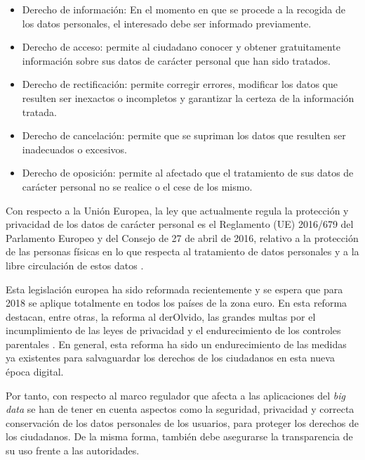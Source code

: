 \clearpage
\begin{itemize}
\item Derecho de información: En el momento en que se procede a la recogida de los datos personales, el interesado debe ser informado previamente. 

\item Derecho de acceso: permite al ciudadano conocer y obtener gratuitamente información sobre sus datos de carácter personal que han sido tratados.

\item Derecho de rectificación: permite corregir errores, modificar los datos que resulten ser inexactos o incompletos y garantizar la certeza de la información tratada.

\item Derecho de cancelación: permite que se supriman los datos que resulten ser inadecuados o excesivos.

\item Derecho de oposición: permite al afectado que el tratamiento de sus datos de carácter personal no se realice o el cese de los mismo.
\end{itemize}

Con respecto a la Unión Europea, la ley que actualmente regula la protección y privacidad de los datos de carácter personal es el Reglamento (UE) 2016/679 del Parlamento Europeo y del Consejo de 27 de abril de 2016, relativo a la protección de las personas físicas en lo que respecta al tratamiento de datos personales y a la libre circulación de estos datos \cite{lawEU}.

Esta legislación europea ha sido reformada recientemente y se espera que para 2018 se aplique totalmente en todos los países de la zona euro. En esta reforma destacan, entre otras, la reforma al \Gls{derOlvido}, las grandes multas por el incumplimiento de las leyes de privacidad y el endurecimiento de los controles parentales \cite{rulesEU}. En general, esta reforma ha sido un endurecimiento de las medidas ya existentes para salvaguardar los derechos de los ciudadanos en esta nueva época digital.

Por tanto, con respecto al marco regulador que afecta a las aplicaciones del \textit{big data} se han de tener en cuenta aspectos como la seguridad, privacidad y correcta conservación de los datos personales de los usuarios, para proteger los derechos de los ciudadanos. De la misma forma, también debe asegurarse la transparencia de su uso frente a las autoridades.

